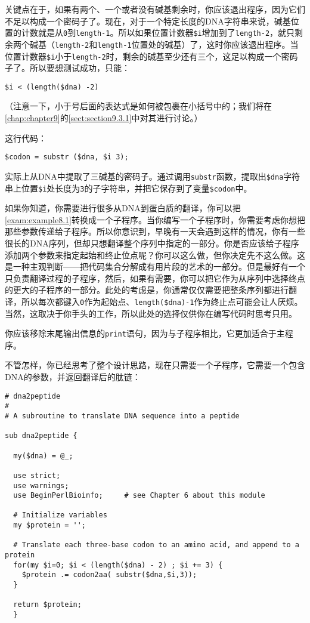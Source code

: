 关键点在于，如果有两个、一个或者没有碱基剩余时，你应该退出程序，因为它们不足以构成一个密码子了。现在，对于一个特定长度的DNA字符串来说，碱基位置的计数就是从\verb|0|到\verb|length-1|。所以如果位置计数器\verb|$i|增加到了\verb|length-2|，就只剩余两个碱基（\verb|length-2|和\verb|length-1|位置处的碱基）了，这时你应该退出程序。当位置计数器\verb|$i|小于\verb|length-2|时，剩余的碱基至少还有三个，这足以构成一个密码子了。所以要想测试成功，只能：

\begin{lstlisting}
$i < (length($dna) -2)
\end{lstlisting}

（注意一下，小于号后面的表达式是如何被包裹在小括号中的；我们将在\autoref{chap:chapter9}的\autoref{sect:section9.3.1}中对其进行讨论。）

这行代码：

\begin{lstlisting}
$codon = substr ($dna, $i 3);
\end{lstlisting}

实际上从DNA中提取了三碱基的密码子。通过调用\verb|substr|函数，提取出\verb|$dna|字符串上位置\verb|$i|处长度为\verb|3|的子字符串，并把它保存到了变量\verb|$codon|中。

如果你知道，你需要进行很多从DNA到蛋白质的翻译，你可以把\autoref{exam:example8.1}转换成一个子程序。当你编写一个子程序时，你需要考虑你想把那些参数传递给子程序。所以你意识到，早晚有一天会遇到这样的情况，你有一些很长的DNA序列，但却只想翻译整个序列中指定的一部分。你是否应该给子程序添加两个参数来指定起始和终止位点呢？你可以这么做，但你决定先不这么做。这是一种主观判断——把代码集合分解成有用片段的艺术的一部分。但是最好有一个只负责翻译过程的子程序，然后，如果有需要，你可以把它作为从序列中选择终点的更大的子程序的一部分。此处的考虑是，你通常仅仅需要把整条序列都进行翻译，所以每次都键入\verb|0|作为起始点、\verb|length($dna)-1|作为终止点可能会让人厌烦。当然，这取决于你手头的工作，所以此处的选择仅供你在编写代码时思考只用。

你应该移除末尾输出信息的\verb|print|语句，因为与子程序相比，它更加适合于主程序。

不管怎样，你已经思考了整个设计思路，现在只需要一个子程序，它需要一个包含DNA的参数，并返回翻译后的肽链：

\begin{lstlisting}
# dna2peptide 
#
# A subroutine to translate DNA sequence into a peptide

sub dna2peptide {
  
  my($dna) = @_;

  use strict;
  use warnings;
  use BeginPerlBioinfo;     # see Chapter 6 about this module

  # Initialize variables
  my $protein = '';

  # Translate each three-base codon to an amino acid, and append to a protein 
  for(my $i=0; $i < (length($dna) - 2) ; $i += 3) {
    $protein .= codon2aa( substr($dna,$i,3));
  }

  return $protein;
  }
\end{lstlisting}

